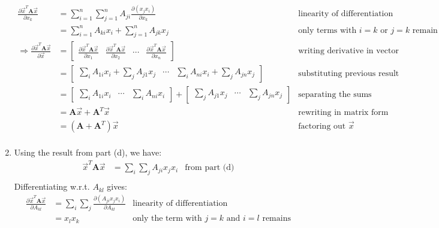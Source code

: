 \documentclass[11pt, fleqn]{article}
\newcommand{\pd}[2]{\frac{\partial #1}{\partial #2}}
\begin{document}
\begin{enumerate}
\begin{align*}
        \pd{\vec{x}^T \textbf{A} \vec{x}}{x_k} &= \sum_{i=1}^{n} \sum_{j=1}^{n} A_{ji} \pd{(x_j x_i)}{x_k} & \text{linearity of differentiation} \\
        &= \sum_{i=1}^{n} A_{ki} x_i + \sum_{j=1}^{n} A_{jk} x_j & \text{only terms with } i = k \text{ or } j = k \text{ remain} \\
        \Rightarrow \pd{\vec{x}^T \textbf{A} \vec{x}}{\vec{x}} &= \begin{bmatrix}
            \pd{\vec{x}^T \textbf{A} \vec{x}}{x_1} & \pd{\vec{x}^T \textbf{A} \vec{x}}{x_2} & \cdots & \pd{\vec{x}^T \textbf{A} \vec{x}}{x_n}
        \end{bmatrix} & \text{writing derivative in vector form} \\
        &= \begin{bmatrix}
            \sum_{i} A_{1i} x_i + \sum_{j} A_{j1} x_j & \cdots & \sum_{i} A_{ni} x_i + \sum_{j} A_{jn} x_j
        \end{bmatrix} & \text{substituting previous result} \\
        &= \begin{bmatrix}
            \sum_{i} A_{1i} x_i & \cdots & \sum_{i} A_{ni} x_i
        \end{bmatrix} + \begin{bmatrix}
            \sum_{j} A_{j1} x_j & \cdots & \sum_{j} A_{jn} x_j
        \end{bmatrix} & \text{separating the sums} \\
        &= \textbf{A} \vec{x} + \textbf{A}^T \vec{x} & \text{rewriting in matrix form} \\
        &= (\textbf{A} + \textbf{A}^T) \vec{x} & \text{factoring out } \vec{x} \\
    \end{align*}
    \item Using the result from part (d), we have:
    \begin{align*}
        \vec{x}^T \textbf{A} \vec{x} &= \sum_{i} \sum_{j} A_{ji} x_j x_i & \text{from part (d)} \\
    \end{align*}
    Differentiating w.r.t. $A_{kl}$ gives:
    \begin{align*}
        \pd{\vec{x}^T \textbf{A} \vec{x}}{A_{kl}} &= \sum_{i} \sum_{j} \pd{(A_{ji} x_j x_i)}{A_{kl}} & \text{linearity of differentiation} \\
        &= x_l x_k & \text{only the term with } j = k \text{ and } i = l \text{ remains} \\

\end{align*}
\end{enumerate}
\end{document}
